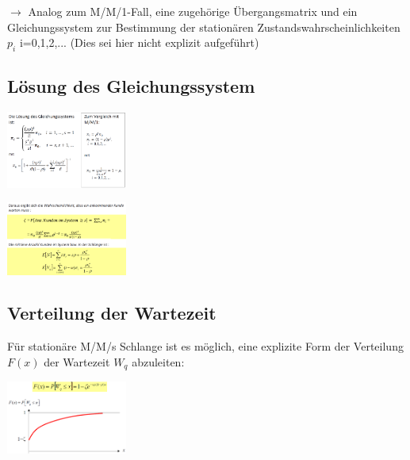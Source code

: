 \documentclass{report}
\newenvironment{Figure}
	{\par\medskip\noindent\minipage{\linewidth}}
	{\endminipage\par\medskip}
\theoremstyle{definition}
\theoremstyle{example}
\begin{document}
$\rightarrow$ Analog zum M/M/1-Fall, eine zugehörige Übergangsmatrix und ein Gleichungssystem zur Bestimmung der stationären Zustandswahrscheinlichkeiten $p_i$ i=0,1,2,... (Dies sei hier nicht explizit aufgeführt)

   \subsection{Lösung des Gleichungssystem}
\begin{Figure}
\centering
\includegraphics[width=150px]{img/LsgGLSMMs.png}
	\label{fig:Abbildung eines Überblickgraphen für das Modell MMs}
\end{Figure}

\begin{Figure}
\centering
\includegraphics[width=150px]{img/BerechnungMMS.png}
	\label{fig:Berechnungen für das Modell MMs}
\end{Figure}

   \subsection{Verteilung der Wartezeit}
Für stationäre M/M/s Schlange ist es möglich, eine explizite Form der Verteilung $F(x)$ der Wartezeit $W_q$ abzuleiten:
\begin{Figure}
\centering
\includegraphics[width=150px]{img/VerteilungWartezeitMMS.png}
	\label{fig:Verteilung der Wartezeit für das Modell M/M/s}
\end{Figure}
\end{document}
